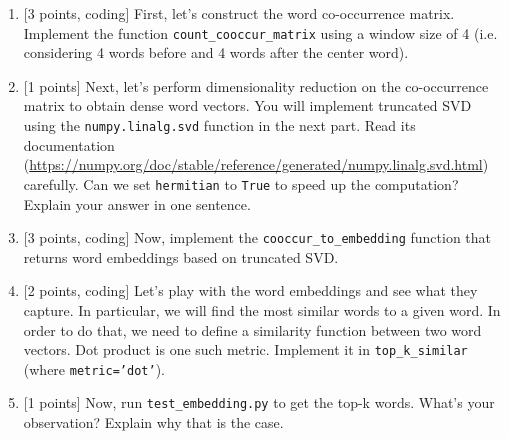 \documentclass{article}
\theoremstyle{case}
\theoremstyle{definition}
\begin{document}
\begin{enumerate}
    \newpage
    \item {[3 points, coding]} First, let's construct the word co-occurrence matrix. Implement the function \texttt{count\_cooccur\_matrix} using a window size of 4 (i.e. considering 4 words before and 4 words after the center word).
        \begin{shaded}
            
        \end{shaded}

    \newpage
    \item {[1 points]} Next, let's perform dimensionality reduction on the co-occurrence matrix to obtain dense word vectors. You will implement truncated SVD using the \texttt{numpy.linalg.svd} function in the next part. Read its documentation (\url{https://numpy.org/doc/stable/reference/generated/numpy.linalg.svd.html}) carefully. Can we set \texttt{hermitian} to \texttt{True} to speed up the computation? Explain your answer in one sentence.

        \begin{shaded}
            
        \end{shaded}

    \newpage
    \item {[3 points, coding]} Now, implement the \texttt{cooccur\_to\_embedding} function that returns word embeddings based on truncated SVD.
        \begin{shaded}
            
        \end{shaded}

    \newpage
    \item {[2 points, coding]} Let's play with the word embeddings and see what they capture. In particular, we will find the most similar words to a given word. In order to do that, we need to define a similarity function between two word vectors. Dot product is one such metric. Implement it in \texttt{top\_k\_similar} (where \texttt{metric='dot'}).
        \begin{shaded}
            
        \end{shaded}

    \newpage
    \item {[1 points]} Now, run \texttt{test\_embedding.py} to get the top-k words. What's your observation? Explain why that is the case.
        \begin{shaded}
        \end{shaded}


\end{enumerate}
\end{document}
